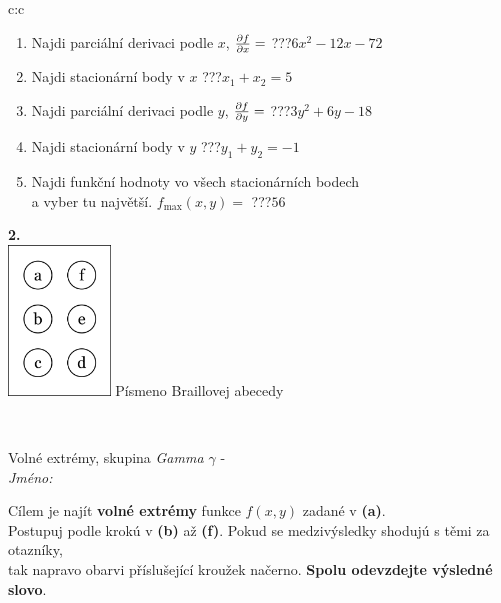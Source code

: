\documentclass[10pt]{report}
\begin{document}
\begin{tabular}{c:c}
\begin{minipage}[c][104.5mm][t]{0.5\linewidth}
\begin{center}
\begin{minipage}{0.79\linewidth}
\begin{center}
\begin{varwidth}{\linewidth}
\begin{enumerate}
\item Najdi parciální derivaci podle $x$, $\pdv{f}{x}=$\quad \dotfill\; ???\;\dotfill \quad $6x^2-12x-72$
\item Najdi stacionární body v $x$\quad \dotfill\; ???\;\dotfill \quad $x_1+x_2=5$
\item Najdi parciální derivaci podle $y$, $\pdv{f}{y}=$\quad \dotfill\; ???\;\dotfill \quad $3y^2+6y-18$
\item Najdi stacionární body v $y$\quad \dotfill\; ???\;\dotfill \quad $y_1+y_2=-1$
\item Najdi funkční hodnoty vo všech stacionárních bodech \\ \phantom{xxxxxx} a vyber tu najvětší. $f_{\text{max}}(x,y)=$\quad \dotfill\; ???\;\dotfill \quad $56$
\end{enumerate}
\end{varwidth}
\end{center}
\end{minipage}
\begin{minipage}{0.20\linewidth}
\begin{center}
{\Huge\bfseries 2.} \\[2mm]
\includegraphics[height=40mm]{../images/braille.png}
{\small Písmeno Braillovej abecedy}
\end{center}
\end{minipage}
\end{center}
\end{minipage}
\\ \hdashline
\begin{minipage}[c][104.5mm][t]{0.5\linewidth}
\begin{center}
\vspace{7mm}
{\huge Volné extrémy, skupina \textit{Gamma $\gamma$} -}\\[5mm]
\textit{Jméno:}\phantom{xxxxxxxxxxxxxxxxxxxxxxxxxxxxxxxxxxxxxxxxxxxxxxxxxxxxxxxxxxxxxxxxx}\\[5mm]
\begin{minipage}{0.95\linewidth}
\begin{center}
Cílem je najít \textbf{volné extrémy} funkce $f(x,y)$ zadané v \textbf{(a)}.\\Postupuj podle krokú v \textbf{(b)} až \textbf{(f)}. Pokud se medzivýsledky shodujú s těmi za otazníky,\\tak napravo obarvi příslušející kroužek načerno. \textbf{Spolu odevzdejte výsledné slovo}.

\end{center}
\end{minipage}
\end{center}
\end{minipage}
\end{tabular}
\end{document}
